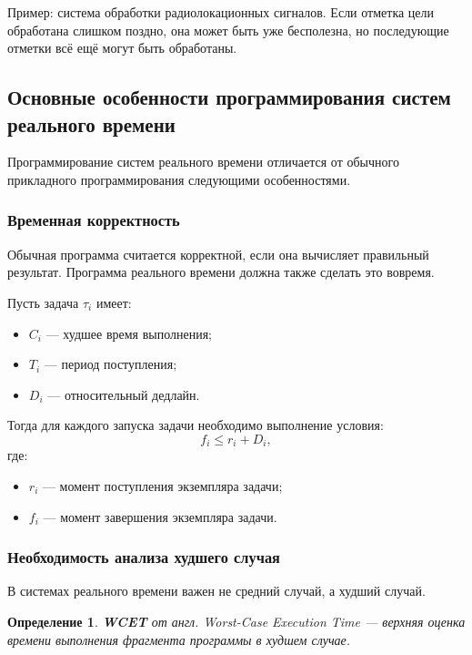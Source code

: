 \documentclass[12pt,a4paper]{article}
\newtheorem{definition}{Определение}
\begin{document}
Пример: система обработки радиолокационных сигналов. Если отметка цели обработана слишком поздно, она может быть уже бесполезна, но последующие отметки всё ещё могут быть обработаны.

\subsection{Основные особенности программирования систем реального времени}

Программирование систем реального времени отличается от обычного прикладного программирования следующими особенностями.

\subsubsection{Временная корректность}

Обычная программа считается корректной, если она вычисляет правильный результат. Программа реального времени должна также сделать это вовремя.

Пусть задача $\tau_i$ имеет:
\begin{itemize}
    \item $C_i$ --- худшее время выполнения;
    \item $T_i$ --- период поступления;
    \item $D_i$ --- относительный дедлайн.
\end{itemize}

Тогда для каждого запуска задачи необходимо выполнение условия:
\[
    f_i \leq r_i + D_i,
\]
где:
\begin{itemize}
    \item $r_i$ --- момент поступления экземпляра задачи;
    \item $f_i$ --- момент завершения экземпляра задачи.
\end{itemize}

\subsubsection{Необходимость анализа худшего случая}

В системах реального времени важен не средний случай, а худший случай.

\begin{definition}
\textbf{WCET} от англ. \emph{Worst-Case Execution Time} --- верхняя оценка времени выполнения фрагмента программы в худшем случае.
\end{definition}
\end{document}
